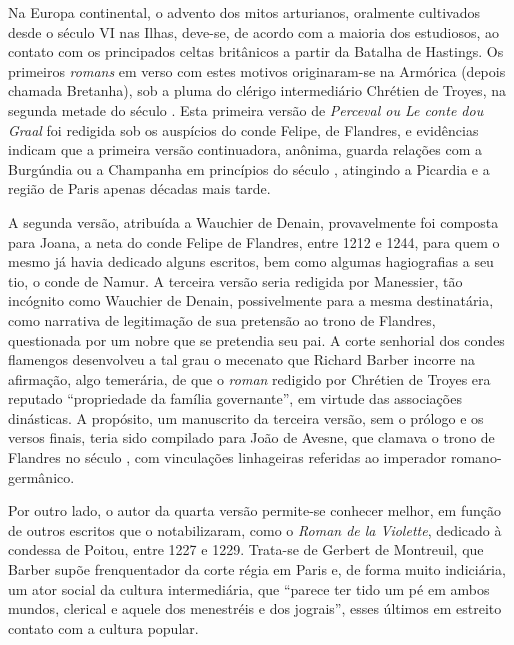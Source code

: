 Na Europa continental, o advento dos mitos arturianos, oralmente cultivados
desde o século VI nas Ilhas, deve-se, de acordo com a maioria dos estudiosos,
ao contato com os principados celtas britânicos a partir da Batalha de
Hastings. Os primeiros \textit{romans} em verso com estes motivos originaram-se
na Armórica (depois chamada Bretanha), sob a pluma do clérigo intermediário
Chrétien de Troyes, na segunda metade do século . Esta primeira versão de
\textit{Perceval ou Le conte dou Graal} foi redigida sob os auspícios do conde
Felipe, de Flandres, e evidências indicam que a primeira versão continuadora,
anônima, guarda relações com a Burgúndia ou a Champanha em princípios do século
, atingindo a Picardia e a região de Paris apenas décadas mais tarde. 

A segunda versão, atribuída a Wauchier de Denain, provavelmente foi composta
para Joana, a neta do conde Felipe de Flandres, entre 1212 e 1244, para quem o
mesmo já havia dedicado alguns escritos, bem como algumas hagiografias a seu
tio, o conde de Namur. A terceira versão seria redigida por Manessier, tão
incógnito como Wauchier de Denain, possivelmente para a mesma destinatária,
como narrativa de legitimação de sua pretensão ao trono de Flandres,
questionada por um nobre que se pretendia seu pai. A corte senhorial dos condes
flamengos desenvolveu a tal grau o mecenato que Richard Barber incorre na
afirmação, algo temerária, de que o \textit{roman} redigido por Chrétien de
Troyes era reputado “propriedade da família governante”, em virtude das
associações dinásticas. A propósito, um manuscrito da terceira versão, sem o
prólogo e os versos finais, teria sido compilado para João  de Avesne, que
clamava o trono de Flandres no século , com vinculações linhageiras
referidas ao imperador romano-germânico.

Por outro lado, o autor da quarta versão permite-se conhecer melhor, em função
de outros escritos que o notabilizaram, como o \textit{Roman de la Violette},
dedicado à condessa de Poitou, entre 1227 e 1229. Trata-se de Gerbert de
Montreuil, que Barber supõe frenquentador da corte régia em Paris e, de forma
muito indiciária, um ator social da cultura intermediária, que “parece ter tido
um pé em ambos mundos, clerical e aquele dos menestréis e dos jograis”, esses
últimos em estreito contato com a cultura popular. 

